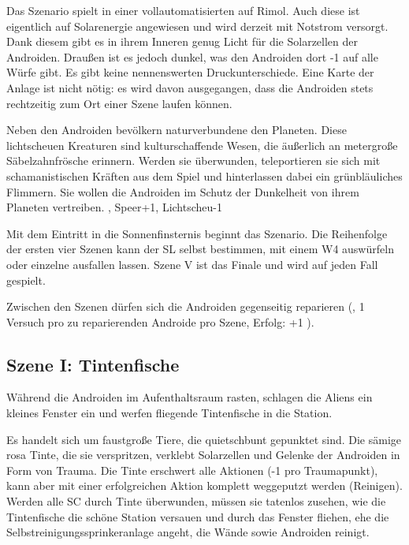 {	

		\noindent
		Das Szenario spielt in einer vollautomatisierten  auf Rimol. Auch diese ist eigentlich auf Solarenergie angewiesen und wird derzeit mit Notstrom versorgt. Dank diesem gibt es in ihrem Inneren genug Licht für die Solarzellen der Androiden. Draußen ist es jedoch dunkel, was den Androiden dort -1 auf alle Würfe gibt. Es gibt keine nennenswerten Druckunterschiede. Eine Karte der Anlage ist nicht nötig: es wird davon ausgegangen, dass die Androiden stets rechtzeitig zum Ort einer Szene laufen können.

		Neben den Androiden bevölkern naturverbundene  den Planeten. Diese lichtscheuen Kreaturen sind kulturschaffende Wesen, die äußerlich an metergroße Säbelzahnfrösche erinnern. Werden sie überwunden, teleportieren sie sich mit schamanistischen Kräften aus dem Spiel und hinterlassen dabei ein grünbläuliches Flimmern. Sie wollen die Androiden im Schutz der Dunkelheit von ihrem Planeten vertreiben. , Speer+1, Lichtscheu-1


		\noindent
		Mit dem Eintritt in die Sonnenfinsternis beginnt das Szenario. Die Reihenfolge der ersten vier Szenen kann der SL selbst bestimmen, mit einem W4 auswürfeln oder einzelne ausfallen lassen. Szene V ist das Finale und wird auf jeden Fall gespielt.

		Zwischen den Szenen dürfen sich die Androiden gegenseitig reparieren (, 1 Versuch pro zu reparierenden Androide pro Szene, Erfolg: +1 \HD).

		\subsection{Szene I: Tintenfische}

		\noindent
		Während die Androiden im Aufenthaltsraum rasten, schlagen die Aliens ein kleines Fenster ein und werfen  fliegende Tintenfische in die Station.

		Es handelt sich um faustgroße Tiere, die quietschbunt gepunktet sind. Die sämige rosa Tinte, die sie verspritzen, verklebt Solarzellen und Gelenke der Androiden in Form von Trauma. Die Tinte erschwert alle Aktionen (-1 pro Traumapunkt), kann aber mit einer erfolgreichen Aktion komplett weggeputzt werden (Reinigen). Werden alle SC durch Tinte überwunden, müssen sie tatenlos zusehen, wie die Tintenfische die schöne Station versauen und durch das Fenster fliehen, ehe die Selbstreinigungssprinkeranlage angeht, die Wände sowie Androiden reinigt.

}
